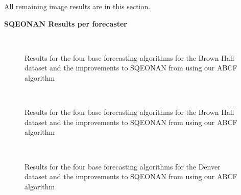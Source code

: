 \label{app:results}
All remaining image results are in this section. 


\bigskip
\noindent \textbf{SQEONAN Results per forecaster} \\
\begin{figure}[!h]
	\begin{center}
		 \\
	\end{center}
	\caption{Results for the four base forecasting algorithms for the Brown Hall dataset and the improvements to SQEONAN from using our ABCF algorithm}
	\label{fig:sqe_merl_results}
\end{figure}

\begin{figure}[!h]
	\begin{center}
		 \\
	\end{center}
	\caption{Results for the four base forecasting algorithms for the Brown Hall dataset and the improvements to SQEONAN from using our ABCF algorithm}
	\label{fig:sqe_brown_results}
\end{figure}

\begin{figure}[!h]
	\begin{center}
		 \\
	\end{center}
	\caption{Results for the four base forecasting algorithms for the Denver dataset and the improvements to SQEONAN from using our ABCF algorithm}
	\label{fig:sqe_denver_results}
\end{figure}

